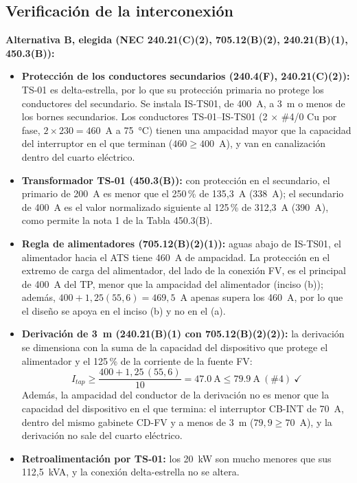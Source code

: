 \documentclass[12pt]{article}
\begin{document}
\subsection{Verificación de la interconexión}
\label{sec:calc_inter}
\textbf{Alternativa B, elegida (NEC 240.21(C)(2), 705.12(B)(2), 240.21(B)(1), 450.3(B)):}
\begin{itemize}
\item \textbf{Protección de los conductores secundarios (240.4(F), 240.21(C)(2)):} TS-01 es delta-estrella, por lo que su protección primaria no protege los conductores del secundario. Se instala IS-TS01, de 400~A, a 3~m o menos de los bornes secundarios. Los conductores TS-01--IS-TS01 (2 $\times$ \#4/0 Cu por fase, $2\times230=460$~A a 75~°C) tienen una ampacidad mayor que la capacidad del interruptor en el que terminan ($460\geq400$~A), y van en canalización dentro del cuarto eléctrico.
\item \textbf{Transformador TS-01 (450.3(B)):} con protección en el secundario, el primario de 200~A es menor que el 250\,\% de 135,3~A (338~A); el secundario de 400~A es el valor normalizado siguiente al 125\,\% de 312,3~A (390~A), como permite la nota 1 de la Tabla 450.3(B).
\item \textbf{Regla de alimentadores (705.12(B)(2)(1)):} aguas abajo de IS-TS01, el alimentador hacia el ATS tiene 460~A de ampacidad. La protección en el extremo de carga del alimentador, del lado de la conexión FV, es el principal de 400~A del TP, menor que la ampacidad del alimentador (inciso (b)); además, $400 + 1{,}25(55{,}6)=469{,}5$~A apenas supera los 460~A, por lo que el diseño se apoya en el inciso (b) y no en el (a).
\item \textbf{Derivación de 3~m (240.21(B)(1) con 705.12(B)(2)(2)):} la derivación se dimensiona con la suma de la capacidad del dispositivo que protege el alimentador y el 125\,\% de la corriente de la fuente FV:
\begin{equation}
I_{tap}\geq\frac{400+1{,}25\,(55{,}6)}{10}=\SI{47.0}{\ampere}\leq\SI{79.9}{\ampere}\ (\#4)\ \checkmark
\end{equation}
Además, la ampacidad del conductor de la derivación no es menor que la capacidad del dispositivo en el que termina: el interruptor CB-INT de 70~A, dentro del mismo gabinete CD-FV y a menos de 3~m ($79{,}9\geq70$~A), y la derivación no sale del cuarto eléctrico.
\item \textbf{Retroalimentación por TS-01:} los 20~kW son mucho menores que sus 112,5~kVA, y la conexión delta-estrella no se altera.
\end{itemize}
\end{document}
